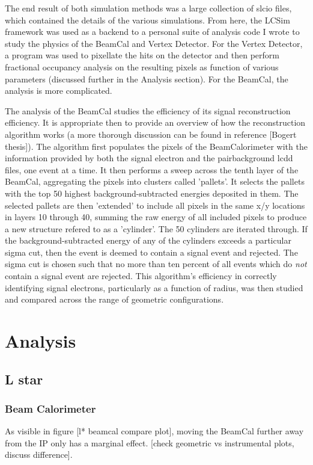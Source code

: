 \documentclass{report}
\begin{document}
            The end result of both simulation methods was a large collection of slcio files, which contained the details of the various simulations. From here, the LCSim framework was used as a backend to a personal suite of analysis code I wrote to study the physics of the BeamCal and Vertex Detector. For the Vertex Detector, a program was used to pixellate the hits on the detector and then perform fractional occupancy analysis on the resulting pixels as function of various parameters (discussed further in the Analysis section). For the BeamCal, the analysis is more complicated.
            
            The analysis of the BeamCal studies the efficiency of its signal reconstruction efficiency. It is appropriate then to provide an overview of how the reconstruction algorithm works (a more thorough discussion can be found in reference [Bogert thesis]). The algorithm first populates the pixels of the BeamCalorimeter with the information provided by both the signal electron and the pairbackground lcdd files, one event at a time. It then performs a sweep across the tenth layer of the BeamCal, aggregating the pixels into clusters called 'pallets'. It selects the pallets with the top 50 highest background-subtracted energies deposited in them. The selected pallets are then 'extended' to include all pixels in the same x/y locations in layers 10 through 40, summing the raw energy of all included pixels to produce a new structure refered to as a 'cylinder'. The 50 cylinders are iterated through. If the background-subtracted energy of any of the cylinders exceeds a particular sigma cut, then the event is deemed to contain a signal event and rejected. The sigma cut is chosen such that no more than ten percent of all events which do \textit{not} contain a signal event are rejected. This algorithm's efficiency in correctly identifying signal electrons, particularly as a function of radius, was then studied and compared across the range of geometric configurations.




    \chapter{Analysis}
        \section{L star}
            \subsection{Beam Calorimeter}
                As visible in figure [l* beamcal compare plot], moving the BeamCal further away from the IP only has a marginal effect. [check geometric vs instrumental plots, discuss difference].
                
\end{document}
